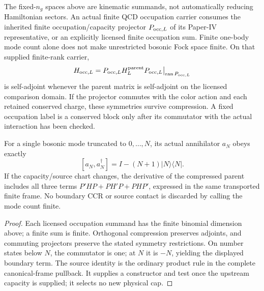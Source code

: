 \documentclass[12pt,a4paper]{article}
\begin{document}
\begin{theorem}
\label{p10:thm:v2211-finite-occupation-assembly}
The fixed-$n_g$ spaces above are kinematic summands, not automatically
reducing Hamiltonian sectors. An actual finite QCD occupation carrier consumes
the inherited finite occupation/capacity projector $P_{{\rm occ},L}$ of its
Paper-IV representative, or an explicitly licensed finite occupation sum.
Finite one-body mode count alone does not make unrestricted bosonic Fock
space finite. On that supplied finite-rank carrier,
\[
 H_{{\rm occ},L}=P_{{\rm occ},L}H_L^{\rm parent}P_{{\rm occ},L}
 \big|_{\operatorname{ran}P_{{\rm occ},L}}
\]
is self-adjoint whenever the parent matrix is self-adjoint on the licensed
comparison domain. If the projector commutes with the color action and each
retained conserved charge, these symmetries survive compression. A fixed
occupation label is a conserved block only after its commutator with the
actual interaction has been checked.

For a single bosonic mode truncated to $0,\ldots,N$, its actual annihilator
$a_N$ obeys exactly
\[
 [a_N,a_N^\dagger]=I-(N+1)|N\rangle\langle N|.
\]
If the capacity/source chart changes, the derivative of the compressed
parent includes all three terms
$P'HP+PH'P+PHP'$, expressed in the same transported finite frame. No
boundary CCR or source contact is discarded by calling the mode count finite.
\end{theorem}
\begin{proof}
Each licensed occupation summand has the finite binomial dimension above;
a finite sum is finite. Orthogonal compression preserves adjoints, and
commuting projectors preserve the stated symmetry restrictions. On number
states below $N$, the commutator is one; at $N$ it is $-N$, yielding the
displayed boundary term. The source identity is the ordinary product rule
in the complete canonical-frame pullback. It supplies a constructor and
test once the upstream capacity is supplied; it selects no new physical cap.
\end{proof}
\end{document}
